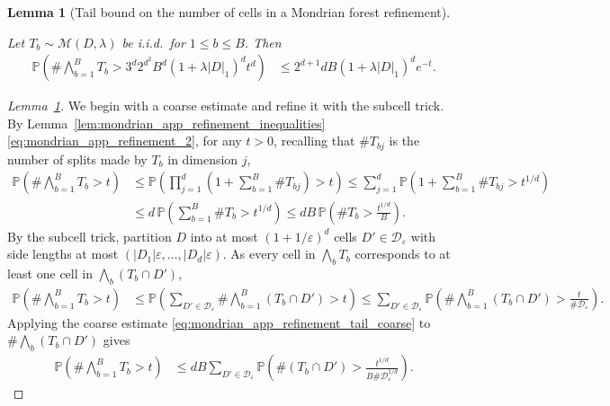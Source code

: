 \documentclass[11pt,lof]{puthesis}
\renewcommand{\P}{\ensuremath{\mathbb{P}}}
\newcommand{\cM}{\ensuremath{\mathcal{M}}}
\newcommand{\cD}{\ensuremath{\mathcal{D}}}
\theoremstyle{break}
\newtheorem{lemma}{Lemma}[section]
\theoremstyle{proof}
\newtheorem{proof}{Proof}
\begin{document}
\begin{lemma}[Tail bound on the number of cells in a Mondrian forest refinement]
\label{lem:mondrian_app_refinement_tail}

Let $T_b \sim \cM(D, \lambda)$ be i.i.d.\ for $1 \leq b \leq B$. Then
%
\begin{align*}
\P\left(
\# \bigwedge_{b=1}^B T_b
> 3^d 2^{d^2} B^d (1+\lambda|D|_1)^d t^d
\right)
&\leq
2^{d+1} d B (1 + \lambda |D|_1)^d e^{-t}.
\end{align*}

\end{lemma}

\begin{proof}[Lemma~\ref{lem:mondrian_app_refinement_tail}]

We begin with a coarse estimate and refine it with the subcell trick.
By Lemma~\ref{lem:mondrian_app_refinement_inequalities}
\eqref{eq:mondrian_app_refinement_2},
for any $t > 0$, recalling that $\# T_{b j}$ is the number
of splits made by $T_b$ in dimension $j$,
%
\begin{align}
\nonumber
\P\left(
\# \bigwedge_{b=1}^B T_b
> t
\right)
&\leq
\P\left(
\prod_{j=1}^d
\left(
1 + \sum_{b=1}^B \# T_{b j}
\right)
> t
\right)
\leq
\sum_{j=1}^d
\P\left(
1 + \sum_{b=1}^B \# T_{b j}
> t^{1/d}
\right) \\
\label{eq:mondrian_app_refinement_tail_coarse}
&\leq
d\, \P\left(
\sum_{b=1}^B \# T_b
> t^{1/d}
\right)
\leq
d B\,
\P\left(
\# T_b > \frac{t^{1/d}}{B}
\right).
\end{align}
%
By the subcell trick, partition $D$ into
at most $(1 + 1/\varepsilon)^d$ cells
$D' \in \cD_\varepsilon$ with side lengths at most
$(|D_1| \varepsilon, \ldots, |D_d| \varepsilon)$.
As every cell in $\bigwedge_b T_b$ corresponds to
at least one cell in $\bigwedge_b (T_b \cap D')$,
%
\begin{align*}
\P\left(
\# \bigwedge_{b=1}^B T_b
> t
\right)
&\leq
\P\left(
\sum_{D' \in \cD_\varepsilon}
\# \bigwedge_{b=1}^B (T_b \cap D')
> t
\right)
\leq
\sum_{D' \in \cD_\varepsilon}
\P\left(
\# \bigwedge_{b=1}^B (T_b \cap D')
> \frac{t}{\# \cD_\varepsilon}
\right).
\end{align*}
%
Applying the coarse estimate \eqref{eq:mondrian_app_refinement_tail_coarse}
to $\# \bigwedge_b (T_b \cap D')$ gives
%
\begin{align*}
\P\left(
\# \bigwedge_{b=1}^B T_b
> t
\right)
&\leq
d B \sum_{D' \in \cD_\varepsilon}
\P\left(
\# (T_b \cap D')
> \frac{t^{1/d}}{B \# \cD_\varepsilon^{1/d}}
\right).
\end{align*}

\end{proof}
\end{document}

